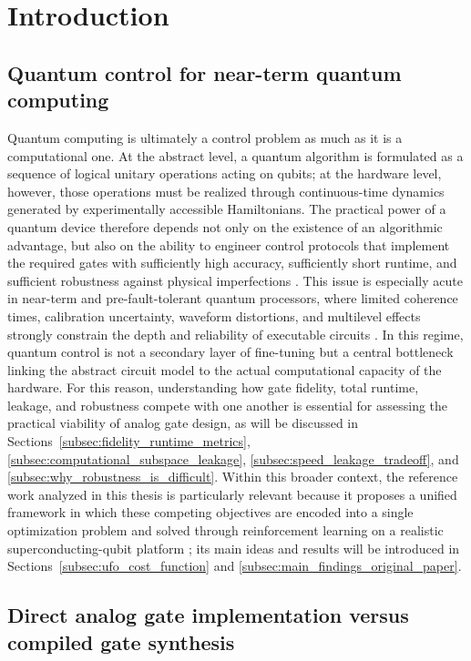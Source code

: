 \chapter{Introduction}


\section{Quantum control for near-term quantum computing}
\label{subsec:intro_quantum_control_nisq}

Quantum computing is ultimately a control problem as much as it is a computational one. At the abstract level, a quantum algorithm is formulated as a sequence of logical unitary operations acting on qubits; at the hardware level, however, those operations must be realized through continuous-time dynamics generated by experimentally accessible Hamiltonians. The practical power of a quantum device therefore depends not only on the existence of an algorithmic advantage, but also on the ability to engineer control protocols that implement the required gates with sufficiently high accuracy, sufficiently short runtime, and sufficient robustness against physical imperfections \cite{Niu2019,Koch2022}. This issue is especially acute in near-term and pre-fault-tolerant quantum processors, where limited coherence times, calibration uncertainty, waveform distortions, and multilevel effects strongly constrain the depth and reliability of executable circuits \cite{Krantz2019,Kjaergaard2020}. In this regime, quantum control is not a secondary layer of fine-tuning but a central bottleneck linking the abstract circuit model to the actual computational capacity of the hardware. For this reason, understanding how gate fidelity, total runtime, leakage, and robustness compete with one another is essential for assessing the practical viability of analog gate design, as will be discussed in Sections~\ref{subsec:fidelity_runtime_metrics}, \ref{subsec:computational_subspace_leakage}, \ref{subsec:speed_leakage_tradeoff}, and \ref{subsec:why_robustness_is_difficult}. Within this broader context, the reference work analyzed in this thesis is particularly relevant because it proposes a unified framework in which these competing objectives are encoded into a single optimization problem and solved through reinforcement learning on a realistic superconducting-qubit platform \cite{Niu2019}; its main ideas and results will be introduced in Sections~\ref{subsec:ufo_cost_function} and \ref{subsec:main_findings_original_paper}.

\section{Direct analog gate implementation versus compiled gate synthesis}
\label{subsec:intro_analog_vs_synthesis}

